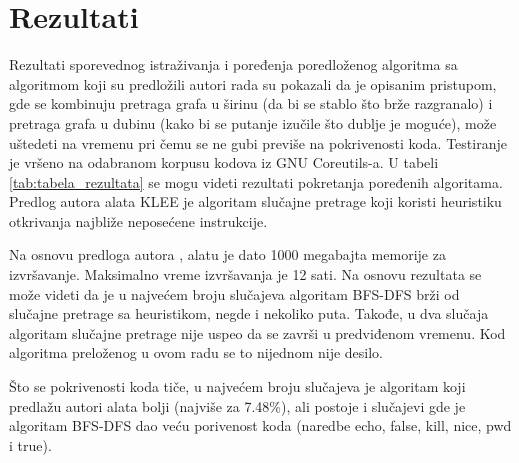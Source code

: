 \documentclass[12pt,oneside]{memoir}
\begin{document}
\section{Rezultati}
Rezultati sporevednog istraživanja i poređenja poredloženog algoritma sa algoritmom koji su predložili autori rada su pokazali da je opisanim pristupom, gde se kombinuju pretraga grafa u širinu (da bi se stablo što brže razgranalo) i pretraga grafa u dubinu (kako bi se putanje izučile što dublje je moguće), može uštedeti na vremenu pri čemu se ne gubi previše na pokrivenosti koda. Testiranje je vršeno na odabranom korpusu kodova iz GNU Coreutils-a. U tabeli \ref{tab:tabela_rezultata} se mogu videti rezultati pokretanja poređenih algoritama. Predlog autora alata KLEE \cite{klee} je algoritam slučajne pretrage koji koristi heuristiku otkrivanja najbliže neposećene instrukcije. 

Na osnovu predloga autora \cite{klee}, alatu je dato 1000 megabajta memorije za izvršavanje. Maksimalno vreme izvršavanja je 12 sati. Na osnovu rezultata se može videti da je u najvećem broju slučajeva algoritam BFS-DFS brži od slučajne pretrage sa heuristikom, negde i nekoliko puta. Takođe, u dva slučaja algoritam slučajne pretrage nije uspeo da se završi u predviđenom vremenu. Kod algoritma preloženog u ovom radu se to nijednom nije desilo. 

Što se pokrivenosti koda tiče, u najvećem broju slučajeva je algoritam koji predlažu autori alata bolji (najviše za 7.48\%), ali postoje i slučajevi gde je algoritam BFS-DFS dao veću porivenost koda (naredbe echo, false, kill, nice, pwd i true).
\end{document}
